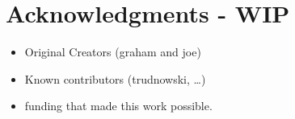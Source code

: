 \chapter*{Acknowledgments - WIP}

\begin{itemize}
\item Original Creators (graham and joe)
\item Known contributors (trudnowski, \ldots)
\item funding that made this work possible.
\end{itemize}

